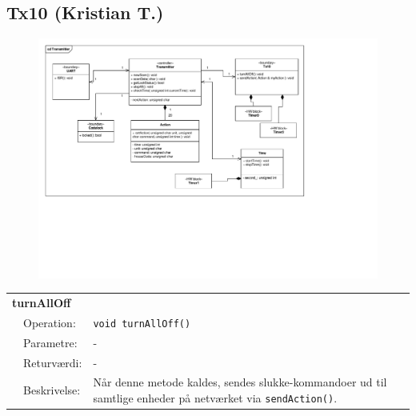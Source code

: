 \subsection{Tx10 (Kristian T.)}

\begin{figure}[h]
\centering
\includegraphics[scale=1,clip=true, trim=488.69 455 197 50]{Systemarkitektur/diagrammer/Transmitter_Klassediagram} %
\end{figure}

\begin{table}[h]
\begin{tabularx}{\textwidth}{p{0.6 cm} l X} %
\multicolumn{3}{l}{\textbf{turnAllOff}}\\
& Operation: & %
\texttt{void turnAllOff()}
\\ & Parametre: & %
-
\\ & Returværdi: & %
-
\\ & Beskrivelse: & %
Når denne metode kaldes, sendes slukke-kommandoer ud til samtlige enheder på netværket via \texttt{sendAction()}.
\\ \end{tabularx}
\end{table}

